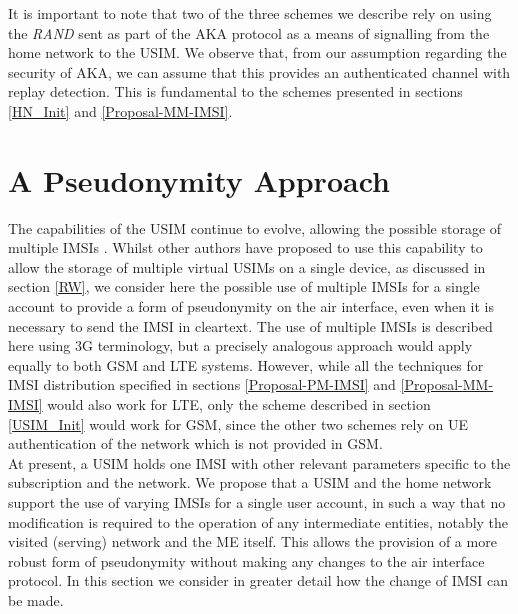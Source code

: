 \documentclass{acm_proc_article-sp}
\begin{document}
It is important to note that two of the three schemes we describe rely on using the \emph{RAND} sent as part of the AKA protocol as a means of signalling from the home network to the USIM. We observe that, from our assumption regarding the security of AKA, we can assume that this provides an authenticated channel with replay detection. This is fundamental to the schemes presented in sections \ref{HN_Init} and \ref{Proposal-MM-IMSI}.


\section{A Pseudonymity Approach} \label{Proposal}

The capabilities of the USIM continue to evolve, allowing the possible storage of multiple IMSIs \cite{patent_identity}. Whilst other authors have proposed to use this capability to allow the storage of multiple virtual USIMs on a single device, as discussed in section \ref{RW}, we consider here the possible use of multiple IMSIs for a single account to provide a form of pseudonymity on the air interface, even when it is necessary to send the IMSI in cleartext. The use of multiple IMSIs is described here using 3G terminology, but a precisely analogous approach would apply equally to both GSM and LTE systems. However, while all the techniques for IMSI distribution specified in sections \ref{Proposal-PM-IMSI} and \ref{Proposal-MM-IMSI} would also work for LTE, only the scheme described in section \ref{USIM_Init} would work for GSM, since the other two schemes rely on UE authentication of the network which is not provided in GSM\@.\\ 

At present, a USIM holds one IMSI with other relevant parameters specific to the subscription and the network. We propose that a USIM and the home network support the use of varying IMSIs for a single user account, in such a way that no modification is required to the operation of any intermediate entities, notably the visited (serving) network and the ME itself. This allows the provision of a more robust form of pseudonymity without making any changes to the air interface protocol. In this section we consider in greater detail how the change of IMSI can be made. \\
\end{document}
